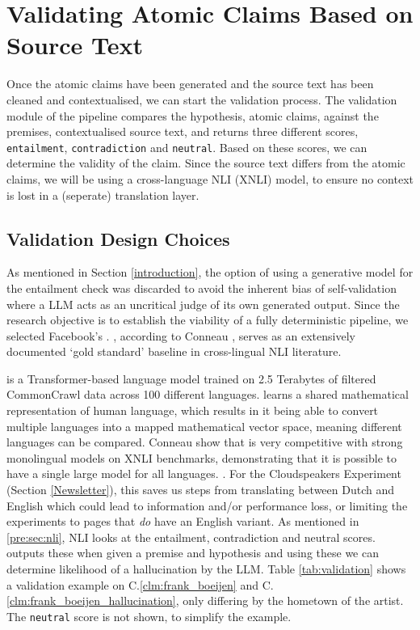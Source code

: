 \section{Validating Atomic Claims Based on Source Text}\label{rsh:validator}
Once the atomic claims have been generated and the source text has been cleaned and contextualised, we can start the validation process. The validation module of the pipeline compares the hypothesis, atomic claims, against the premises, contextualised source text, and returns three different scores, \texttt{entailment}, \texttt{contradiction} and \texttt{neutral}. Based on these scores, we can determine the validity of the claim. Since the source text differs from the atomic claims, we will be using a cross-language NLI (XNLI) model, to ensure no context is lost in a (seperate) translation layer.

\subsection{Validation Design Choices}
As mentioned in Section \ref{introduction}, the option of using a generative model for the entailment check was discarded to avoid the inherent bias of self-validation where a LLM acts as an uncritical judge of its own generated output. Since the research objective is to establish the viability of a fully deterministic pipeline, we selected Facebook's \rob \cite{conneau2020unsupervised}. \rob, according to Conneau \etal, serves as an extensively documented `gold standard' baseline in cross-lingual NLI literature. 

\rob is a Transformer-based language model trained on 2.5 Terabytes of filtered CommonCrawl data across 100 different languages.
\rob learns a shared mathematical representation of human language, which results in it being able to convert multiple languages into a mapped mathematical vector space, meaning different languages can be compared. 
Conneau \etal show that \rob is very competitive with strong monolingual models on XNLI benchmarks, demonstrating that it is possible to have a single large model for all languages. \cite{conneau2020unsupervised}.
For the Cloudspeakers Experiment (Section \ref{Newsletter}), this saves us steps from translating between Dutch and English which could lead to information and/or performance loss, or limiting the experiments to pages that \textit{do} have an English variant. 
As mentioned in \ref{pre:sec:nli}, NLI looks at the entailment, contradiction and neutral scores. \rob outputs these when given a premise and hypothesis and using these we can determine likelihood of a hallucination by the LLM. Table \ref{tab:validation} shows a validation example on C.\ref{clm:frank_boeijen} and C.\ref{clm:frank_boeijen_hallucination}, only differing by the hometown of the artist. The \texttt{neutral} score is not shown, to simplify the example.  

